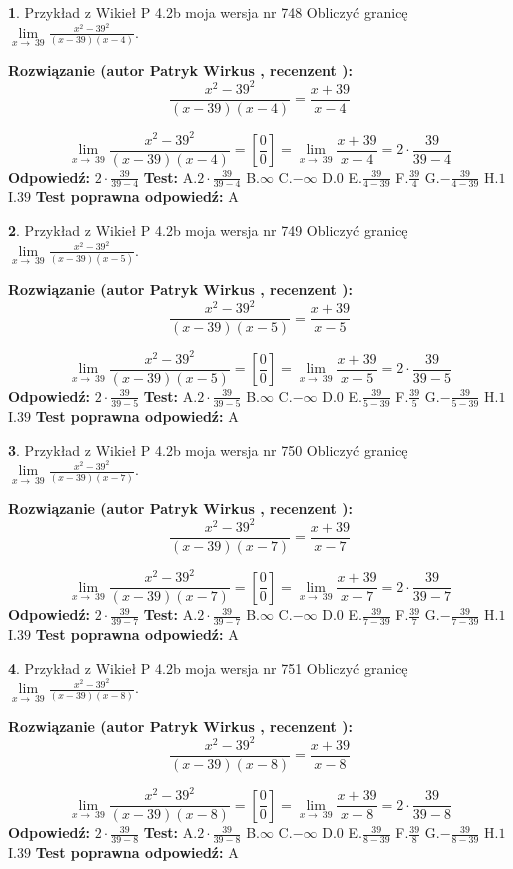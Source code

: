 \documentclass[12pt, a4paper]{article}
\theoremstyle{definition} %
\newtheorem{zad}{}
\newcommand{\zadStart}[1]{\begin{zad}#1\newline}
\newcommand{\zadStop}{\end{zad}}
\newcommand{\rozwStart}[2]{\noindent \textbf{Rozwiązanie (autor #1 , recenzent #2): }\newline}
\newcommand{\rozwStop}{\newline}
\newcommand{\odpStart}{\noindent \textbf{Odpowiedź:}\newline}
\newcommand{\odpStop}{\newline}
\newcommand{\testStart}{\noindent \textbf{Test:}\newline}
\newcommand{\testStop}{\newline}
\newcommand{\kluczStart}{\noindent \textbf{Test poprawna odpowiedź:}\newline}
\newcommand{\kluczStop}{\newline}
\begin{document}
\zadStart{Przykład z Wikieł P 4.2b moja wersja nr 748}
Obliczyć granicę $\lim\limits_{x\to\ 39}\frac{x^{2}-39^{2}}{(x-39)(x-4)}$.
\zadStop
\rozwStart{Patryk Wirkus}{}
$$\frac{x^{2}-39^{2}}{(x-39)(x-4)}=\frac{x+39}{x-4}$$

$$\lim\limits_{x\to\ 39}\frac{x^{2}-39^{2}}{(x-39)(x-4)}=[\frac{0}{0}]=\lim\limits_{x\to\ 39}\frac{x+39}{x-4}=2 \cdot \frac{39}{39-4}$$
\rozwStop
\odpStart
$2 \cdot \frac{39}{39-4}$
\odpStop
\testStart
A.$2 \cdot \frac{39}{39-4}$
B.$\infty$
C.$-\infty$
D.$0$
E.$\frac{39}{4-39}$
F.$\frac{39}{4}$
G.$-\frac{39}{4-39}$
H.$1$
I.$39$
\testStop
\kluczStart
A
\kluczStop



\zadStart{Przykład z Wikieł P 4.2b moja wersja nr 749}
Obliczyć granicę $\lim\limits_{x\to\ 39}\frac{x^{2}-39^{2}}{(x-39)(x-5)}$.
\zadStop
\rozwStart{Patryk Wirkus}{}
$$\frac{x^{2}-39^{2}}{(x-39)(x-5)}=\frac{x+39}{x-5}$$

$$\lim\limits_{x\to\ 39}\frac{x^{2}-39^{2}}{(x-39)(x-5)}=[\frac{0}{0}]=\lim\limits_{x\to\ 39}\frac{x+39}{x-5}=2 \cdot \frac{39}{39-5}$$
\rozwStop
\odpStart
$2 \cdot \frac{39}{39-5}$
\odpStop
\testStart
A.$2 \cdot \frac{39}{39-5}$
B.$\infty$
C.$-\infty$
D.$0$
E.$\frac{39}{5-39}$
F.$\frac{39}{5}$
G.$-\frac{39}{5-39}$
H.$1$
I.$39$
\testStop
\kluczStart
A
\kluczStop



\zadStart{Przykład z Wikieł P 4.2b moja wersja nr 750}
Obliczyć granicę $\lim\limits_{x\to\ 39}\frac{x^{2}-39^{2}}{(x-39)(x-7)}$.
\zadStop
\rozwStart{Patryk Wirkus}{}
$$\frac{x^{2}-39^{2}}{(x-39)(x-7)}=\frac{x+39}{x-7}$$

$$\lim\limits_{x\to\ 39}\frac{x^{2}-39^{2}}{(x-39)(x-7)}=[\frac{0}{0}]=\lim\limits_{x\to\ 39}\frac{x+39}{x-7}=2 \cdot \frac{39}{39-7}$$
\rozwStop
\odpStart
$2 \cdot \frac{39}{39-7}$
\odpStop
\testStart
A.$2 \cdot \frac{39}{39-7}$
B.$\infty$
C.$-\infty$
D.$0$
E.$\frac{39}{7-39}$
F.$\frac{39}{7}$
G.$-\frac{39}{7-39}$
H.$1$
I.$39$
\testStop
\kluczStart
A
\kluczStop



\zadStart{Przykład z Wikieł P 4.2b moja wersja nr 751}
Obliczyć granicę $\lim\limits_{x\to\ 39}\frac{x^{2}-39^{2}}{(x-39)(x-8)}$.
\zadStop
\rozwStart{Patryk Wirkus}{}
$$\frac{x^{2}-39^{2}}{(x-39)(x-8)}=\frac{x+39}{x-8}$$

$$\lim\limits_{x\to\ 39}\frac{x^{2}-39^{2}}{(x-39)(x-8)}=[\frac{0}{0}]=\lim\limits_{x\to\ 39}\frac{x+39}{x-8}=2 \cdot \frac{39}{39-8}$$
\rozwStop
\odpStart
$2 \cdot \frac{39}{39-8}$
\odpStop
\testStart
A.$2 \cdot \frac{39}{39-8}$
B.$\infty$
C.$-\infty$
D.$0$
E.$\frac{39}{8-39}$
F.$\frac{39}{8}$
G.$-\frac{39}{8-39}$
H.$1$
I.$39$
\testStop
\kluczStart
A
\kluczStop
\end{document}
